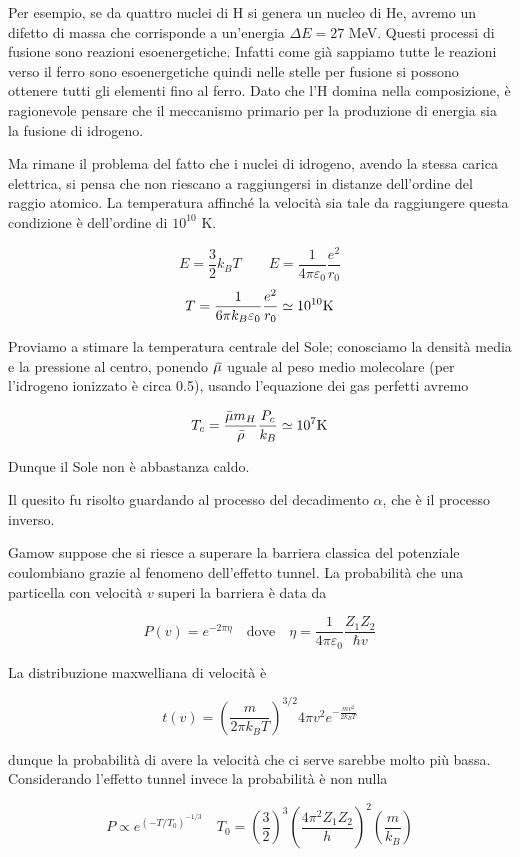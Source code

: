 Per esempio, se da quattro nuclei di H si genera un nucleo di He, avremo un difetto di massa che corrisponde a un'energia $\Delta E=27$ MeV. Questi processi di fusione sono reazioni esoenergetiche. Infatti come già sappiamo tutte le reazioni verso il ferro sono esoenergetiche quindi nelle stelle per fusione si possono ottenere tutti gli elementi fino al ferro. Dato che l'H domina nella composizione, è ragionevole pensare che il meccanismo primario per la produzione di energia sia la fusione di idrogeno.

Ma rimane il problema del fatto che i nuclei di idrogeno, avendo la stessa carica elettrica, si pensa che non riescano a raggiungersi in distanze dell'ordine del raggio atomico. La temperatura affinché la velocità sia tale da raggiungere questa condizione è dell'ordine di $10^{10}$ K.

$$E=\frac{3}{2}k_B T \qquad E
=\frac{1}{4\pi \varepsilon_0}\frac{e^2}{r_0}$$
$$T=\frac{1}{6\pi k_B \varepsilon_0}\frac{e^2}{r_0}\simeq 10^{10} \rm K$$

Proviamo a stimare la temperatura centrale del Sole; conosciamo la densità media e la pressione al centro, ponendo ${}\mkern3mu\overline{\mkern-3mu\mu}$ uguale al peso medio molecolare (per l'idrogeno ionizzato è circa 0.5), usando l'equazione dei gas perfetti avremo

$$T_c=\frac{\Bar{\mu}m_H}{\Bar{\rho}}\frac{P_c}{k_B}\simeq 10^7 \rm K$$

Dunque il Sole non è abbastanza caldo.

Il quesito fu risolto guardando al processo del decadimento $\alpha$, che è il processo inverso.

Gamow suppose che si riesce a superare la barriera classica del potenziale coulombiano grazie al fenomeno dell'effetto tunnel. La probabilità che una particella con velocità $v$ superi la barriera è data da

$$P(v)=e^{-2\pi \eta}
\quad\text{dove}\quad
\eta=\frac{1}{4\pi \varepsilon_0}\frac{Z_1Z_2}{\hbar v}$$

La distribuzione maxwelliana di velocità è

$$t(v)=\left( \frac{m}{2\pi k_B T} \right)^{3/2}4\pi v^2 e^{-\frac{mv^2}{2k_BT}}$$

dunque la probabilità di avere la velocità che ci serve sarebbe molto più bassa. Considerando l'effetto tunnel invece la probabilità è non nulla

$$P\propto e^{(-T/T_0)^{-1/3}}\quad T_0=\left( \frac{3}{2} \right)^3\left( \frac{4\pi^2 Z_1Z_2}{h} \right)^2\left( \frac{m}{k_B} \right)$$

